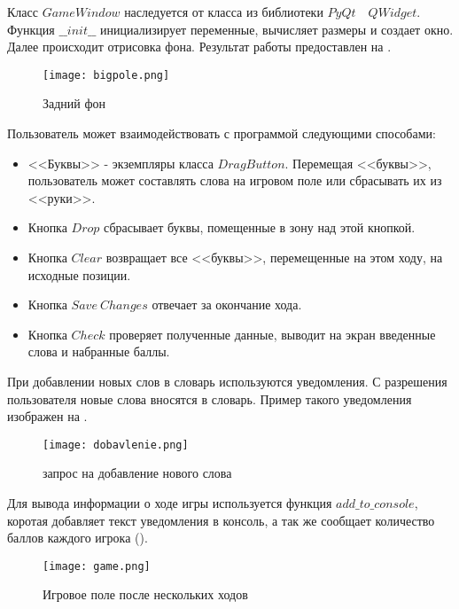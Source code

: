 \documentclass[a4paper,14pt]{article}
\begin{document}
	Класс $GameWindow$ наследуется от класса из библиотеки $PyQt$~~$QWidget$.	
	Функция $\_\_init\_\_$  инициализирует переменные, вычисляет размеры и создает окно.	
	Далее происходит отрисовка фона.
	Результат работы предоставлен на .

	\begin{figure}[H]
		\centering
		\texttt{[image: bigpole.png]}
		\caption{Задний фон}
		\label{img:background}
	\end{figure}
	
	 Пользователь может взаимодействовать с программой следующими способами: 
	 \begin {itemize}
	 \item <<Буквы>> - экземпляры класса $DragButton$. Перемещая <<буквы>>, пользователь может составлять слова на игровом поле или сбрасывать их из <<руки>>.
	 \item Кнопка $Drop$ сбрасывает буквы, помещенные в зону над этой кнопкой.
	 \item Кнопка $Clear$ возвращает все <<буквы>>, перемещенные на этом ходу, на исходные позиции.
	 \item Кнопка $Save~Changes$ отвечает за окончание хода.
	 \item Кнопка $Check$ проверяет полученные данные, выводит на экран введенные слова и набранные баллы.
	 \end{itemize}	
	 
	 При добавлении новых слов в словарь используются уведомления. С разрешения пользователя новые слова вносятся в словарь. Пример такого уведомления изображен на .
	\begin{figure}[bhtp]
		\centering
		\texttt{[image: dobavlenie.png]}
		\caption{запрос на добавление нового слова}
		\label{img:dob}
	\end{figure}
		
	Для вывода информации о ходе игры используется функция $add\_to\_console$, коротая добавляет текст уведомления в консоль, а так же сообщает количество баллов каждого игрока ().

	\begin{figure}[H]
		\centering
		\texttt{[image: game.png]}
		\caption{Игровое поле после нескольких ходов}
		\label{img:game}
	\end{figure}
\end{document}
